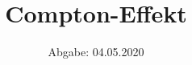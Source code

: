 

\subject{V603}
\title{Compton-Effekt}
\date{%
  Abgabe: 04.05.2020
}



\renewcommand{\subsectionautorefname}{Abschnitt} %

\maketitle
\thispagestyle{empty}
\tableofcontents
\newpage







\printbibliography{}




